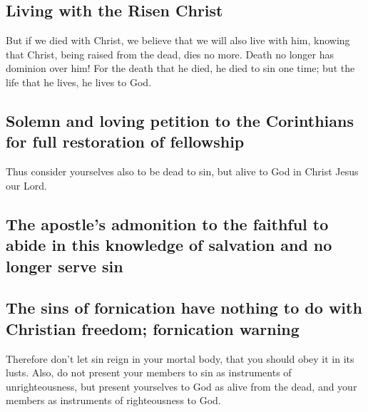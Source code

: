 \hypertarget{living-with-the-risen-christ}{%
\subsection{Living with the Risen
Christ}\label{living-with-the-risen-christ}}

 But if we died with Christ, we believe that we will also
live with him,  knowing that Christ, being raised from the
dead, dies no more. Death no longer has dominion over him!
 For the death that he died, he died to sin one time; but
the life that he lives, he lives to God.

\hypertarget{solemn-and-loving-petition-to-the-corinthians-for-full-restoration-of-fellowship}{%
\subsection{Solemn and loving petition to the Corinthians for full
restoration of
fellowship}\label{solemn-and-loving-petition-to-the-corinthians-for-full-restoration-of-fellowship}}

 Thus consider yourselves also to be dead to sin, but
alive to God in Christ Jesus our Lord.

\hypertarget{the-apostles-admonition-to-the-faithful-to-abide-in-this-knowledge-of-salvation-and-no-longer-serve-sin}{%
\subsection{The apostle's admonition to the faithful to abide in this
knowledge of salvation and no longer serve
sin}\label{the-apostles-admonition-to-the-faithful-to-abide-in-this-knowledge-of-salvation-and-no-longer-serve-sin}}

\hypertarget{the-sins-of-fornication-have-nothing-to-do-with-christian-freedom-fornication-warning}{%
\subsection{The sins of fornication have nothing to do with Christian
freedom; fornication
warning}\label{the-sins-of-fornication-have-nothing-to-do-with-christian-freedom-fornication-warning}}

 Therefore don't let sin reign in your mortal body, that
you should obey it in its lusts.  Also, do not present
your members to sin as instruments of unrighteousness, but present
yourselves to God as alive from the dead, and your members as
instruments of righteousness to God.

